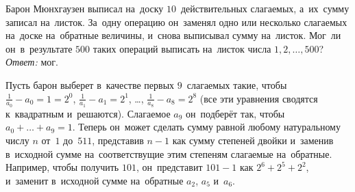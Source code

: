 \problem
Барон Мюнхгаузен выписал на~доску $10$~действительных слагаемых, а~их~сумму
записал на~листок.
За~одну операцию он~заменял одно или несколько слагаемых на~доске на~обратные
величины, и~снова выписывал сумму на~листок.
Мог~ли он~в~результате $500$ таких операций выписать на~листок числа
$1, 2, \ldots, 500$?
\solution
\emph{Ответ:} мог.
\par
Пусть барон выберет в~качестве первых $9$~слагаемых такие, чтобы
$\frac{1}{a_0} - a_0 = 1 = 2^0$,
$\frac{1}{a_1} - a_1 = 2^1$,
\ldots,
$\frac{1}{a_8} - a_8 = 2^8$
(все эти уравнения сводятся к~квадратным и~решаются).
Слагаемое $a_9$ он~подберёт так, чтобы $a_0 + \ldots + a_9 = 1$.
Теперь он~может сделать сумму равной любому натуральному числу $n$ от~$1$
до~$511$, представив $n - 1$ как сумму степеней двойки и~заменив в~исходной
сумме на~соответствущие этим степеням слагаемые на~обратные.
Например, чтобы получить $101$, он~представит $101 - 1$ как $2^6 + 2^5 + 2^2$,
и~заменит в~исходной сумме на~обратные $a_2$, $a_5$ и~$a_6$.
\endproblem
